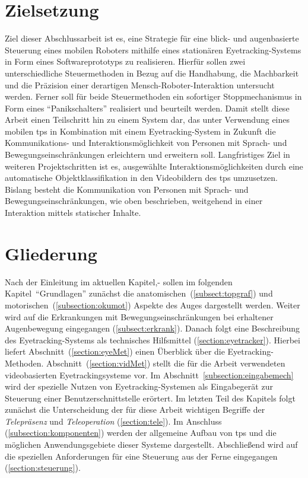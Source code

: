 \section{Zielsetzung}
\label{section:zielsetzung}
Ziel dieser Abschlussarbeit ist es, eine Strategie für eine blick- und augenbasierte Steuerung eines mobilen Roboters mithilfe eines stationären Eyetracking-Systems in Form eines Softwareprototyps zu realisieren. Hierfür sollen zwei unterschiedliche Steuermethoden in Bezug auf die Handhabung, die Machbarkeit und die Präzision einer derartigen Mensch-Roboter-Interaktion untersucht werden. Ferner soll für beide Steuermethoden ein sofortiger Stoppmechanismus in Form eines \enquote{Panikschalters} realisiert und beurteilt werden. Damit stellt diese Arbeit einen Teilschritt hin zu einem System dar, das unter Verwendung eines mobilen \acf{tps} in Kombination mit einem Eyetracking-System in Zukunft die Kommunikations- und Interaktionsmöglichkeit von Personen mit Sprach- und Bewegungseinschränkungen erleichtern und erweitern soll. Langfristiges Ziel in weiteren Projektschritten ist es, ausgewählte Interaktionsmöglichkeiten durch eine automatische Objektklassifikation in den Videobildern des \acs{tps} umzusetzen. Bislang besteht die Kommunikation von Personen mit Sprach- und Bewegungseinschränkungen, wie oben beschrieben, weitgehend in einer Interaktion mittels statischer Inhalte.

\section{Gliederung}
\label{section:gliederung}

Nach der Einleitung im aktuellen Kapitel,- sollen im folgenden Kapitel~\enquote{Grundlagen} zunächst die anatomischen~(\ref{subsect:topgraf}) und motorischen~(\ref{subsection:okumot}) Aspekte des Auges dargestellt werden. Weiter wird auf die Erkrankungen mit Bewegungseinschränkungen bei erhaltener Augenbewegung eingegangen (\ref{subsect:erkrank}). Danach folgt eine Beschreibung des Eyetracking-Systems als technisches Hilfsmittel (\ref{section:eyetracker}). Hierbei liefert Abschnitt~(\ref{section:eyeMet}) einen Überblick über die Eyetracking-Methoden. Abschnitt~(\ref{section:vidMet}) stellt die für die Arbeit verwendeten videobasierten Eyetrackingsysteme vor. Im Abschnitt~\ref{subsection:eingabemech} wird der spezielle Nutzen von Eyetracking-Systemen als Eingabegerät zur Steuerung einer Benutzerschnittstelle erörtert. Im letzten Teil des Kapitels folgt zunächst die Unterscheidung der für diese Arbeit wichtigen Begriffe der \textit{Telepräsenz} und \textit{Teleoperation} (\ref{section:tele}). Im Anschluss (\ref{subsection:komponenten}) werden der allgemeine Aufbau von \acs{tps} und die möglichen Anwendungsgebiete dieser Systeme dargestellt. Abschließend wird auf die speziellen Anforderungen für eine Steuerung aus der Ferne eingegangen (\ref{section:steuerung}). 

